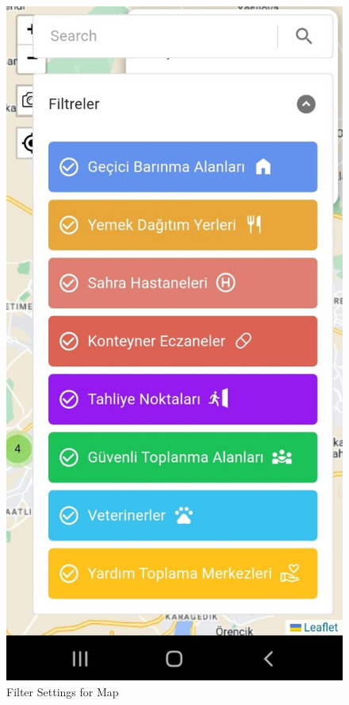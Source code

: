 \begin{figure}[H]
    \begin{center}
        \includegraphics[scale = 0.15]{assets/filter.jpeg}
        \caption[Filter Settings for Map]{Filter Settings for Map}
    \end{center}
\end{figure}

